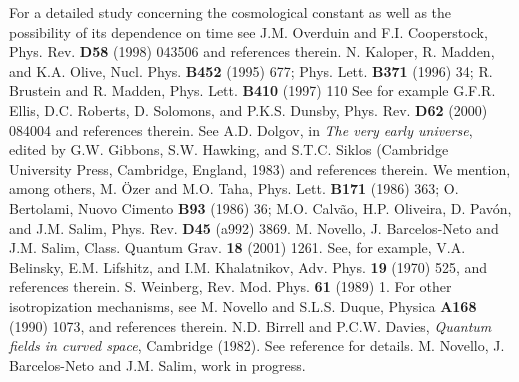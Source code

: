 \documentclass[a4paper,twocolumn,prd,superscriptaddress,nofootinbib,showpacs]
{revtex4}
\begin{document}
\vspace{1cm}
\begin{thebibliography}{100}
 For a detailed study concerning the cosmological
constant as well as the possibility of its dependence on time see J.M.
Overduin and F.I. Cooperstock, Phys. Rev. {\bf D58} (1998) 043506 and
references therein.
 N. Kaloper, R. Madden, and K.A. Olive, Nucl. Phys.
{\bf B452} (1995) 677; Phys. Lett. {\bf B371} (1996) 34; R. Brustein
and R. Madden, Phys. Lett. {\bf B410} (1997) 110
 See for example G.F.R. Ellis, D.C. Roberts, D.
Solomons, and P.K.S. Dunsby, Phys. Rev. {\bf D62} (2000) 084004 and
references therein.
 See A.D. Dolgov, in {\it The very early universe},
edited by G.W. Gibbons, S.W. Hawking, and S.T.C. Siklos (Cambridge
University Press, Cambridge, England, 1983) and references therein.
 We mention, among others, M. \"Ozer and M.O. Taha,
Phys. Lett. {\bf B171} (1986) 363; O. Bertolami, Nuovo Cimento {\bf
B93} (1986) 36; M.O. Calv\~ao, H.P. Oliveira, D. Pav\'on, and J.M.
Salim, Phys. Rev. {\bf D45} (a992) 3869.
 M. Novello, J. Barcelos-Neto and J.M. Salim, Class.
Quantum Grav. {\bf18} (2001) 1261.
 See, for example, V.A. Belinsky, E.M. Lifshitz, and
I.M. Khalatnikov, Adv. Phys. {\bf19} (1970) 525, and references
therein.
 S. Weinberg, Rev. Mod. Phys. {\bf61} (1989) 1.
 For other isotropization mechanisms, see M. Novello
and S.L.S. Duque, Physica {\bf A168} (1990) 1073, and references
therein.
 N.D. Birrell and P.C.W. Davies, {\it Quantum fields
in curved space}, Cambridge (1982).
 See reference \cite{Novello} for details.
 M. Novello, J. Barcelos-Neto and J.M. Salim, work
in progress.

\end{thebibliography}
\end{document}
